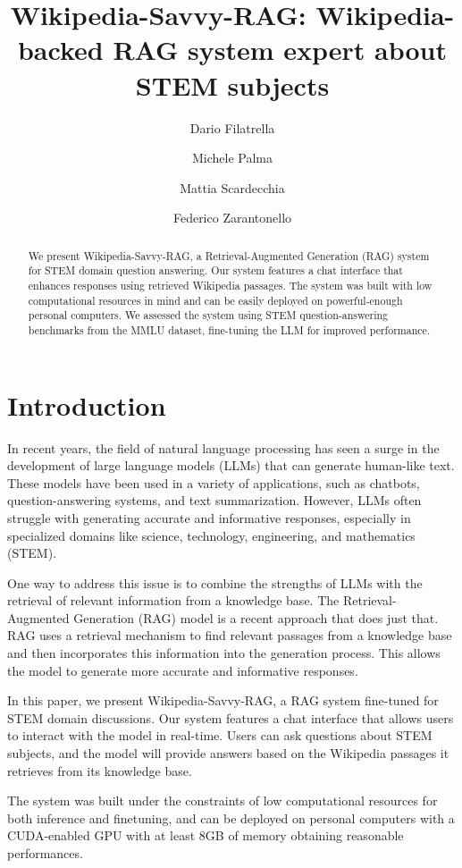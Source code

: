 \documentclass[11pt]{article}
\title{Wikipedia-Savvy-RAG: Wikipedia-backed RAG system expert about STEM subjects}
\author{Dario Filatrella \and Michele Palma \and Mattia Scardecchia \and Federico Zarantonello}
\begin{document}
\maketitle
\begin{abstract}
We present Wikipedia-Savvy-RAG, a Retrieval-Augmented Generation (RAG) system for 
STEM domain question answering. Our system features a chat interface that 
enhances responses using retrieved Wikipedia passages.
The system was built with low computational resources in mind and can be easily
deployed on powerful-enough personal computers.
We assessed the system using STEM question-answering benchmarks from the MMLU dataset, 
fine-tuning the LLM for improved performance. 

\end{abstract}

\section{Introduction}

In recent years, the field of natural language processing has seen a surge in
the development of large language models (LLMs) that can generate human-like text.
These models have been used in a variety of applications, such as chatbots,
question-answering systems, and text summarization. However, LLMs often struggle
with generating accurate and informative responses, especially in specialized
domains like science, technology, engineering, and mathematics (STEM).

One way to address this issue is to combine the strengths of LLMs with the
retrieval of relevant information from a knowledge base. The Retrieval-Augmented
Generation (RAG) model is a recent approach that does just that. RAG uses a
retrieval mechanism to find relevant passages from a knowledge base and then
incorporates this information into the generation process. This allows the model
to generate more accurate and informative responses.

In this paper, we present Wikipedia-Savvy-RAG, a RAG system fine-tuned for STEM
domain discussions. Our system features a chat interface that allows users to
interact with the model in real-time. Users can ask questions about STEM
subjects, and the model will provide answers based on the Wikipedia passages it
retrieves from its knowledge base. 

The system was built under the constraints of low computational resources for 
both inference and finetuning, and can be deployed on personal computers with a
CUDA-enabled GPU with at least 8GB of memory obtaining reasonable performances.
\end{document}
